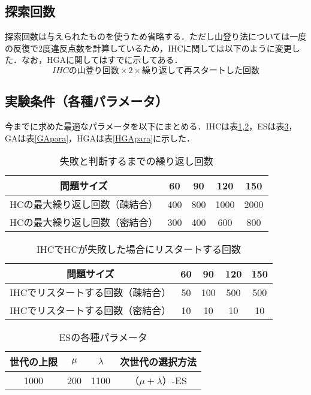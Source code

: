 \documentclass[a4j]{jarticle}
\begin{document}
\subsection{探索回数}
探索回数は与えられたものを使うため省略する．ただし山登り法については一度の反復で2度違反点数を計算しているため，IHCに関しては以下のように変更した．なお，HGAに関してはすでに示してある．
$$
IHCの山登り回数 \times 2 \times 繰り返して再スタートした回数
$$

\subsection{実験条件（各種パラメータ）}
今までに求めた最適なパラメータを以下にまとめる．IHCは表\ref{maxloopHC},\ref{maxloopIHC}，ESは表\ref{ESpara}，GAは表\ref{GApara}，HGAは表\ref{HGApara}に示した．

\begin{table}[H]
 \begin{center} 
  \caption{失敗と判断するまでの繰り返し回数} 
  \label{maxloopHC}
  \begin{tabular}[t]{|c|c|c|c|c|} \hline
   問題サイズ& 60& 90& 120& 150 \\ \hline \hline
   HCの最大繰り返し回数（疎結合）& 400& 800& 1000& 2000 \\ \hline
   HCの最大繰り返し回数（密結合）& 300& 400& 600& 800 \\ \hline
  \end{tabular}
 \end{center}
\end{table}

\begin{table}[H]
 \begin{center}
  \caption{IHCでHCが失敗した場合にリスタートする回数}
  \label{maxloopIHC}
  \begin{tabular}[t]{|c|c|c|c|c|} \hline
   問題サイズ& 60& 90& 120& 150 \\ \hline \hline
   IHCでリスタートする回数（疎結合）& 50& 100& 500& 500 \\ \hline
   IHCでリスタートする回数（密結合）& 10& 10& 10& 10\\ \hline
  \end{tabular}
 \end{center}
\end{table}

\begin{table}[H]
 \begin{center}
  \caption{ESの各種パラメータ}
  \label{ESpara}
  \begin{tabular}[t]{|c|c|c|c|} \hline
世代の上限 & $\mu$ & $\lambda$ & 次世代の選択方法 \\\hline
1000 & 200 & 1100 & （$\mu + \lambda$）-ES \\\hline
  \end{tabular}
 \end{center}
\end{table}
\end{document}
